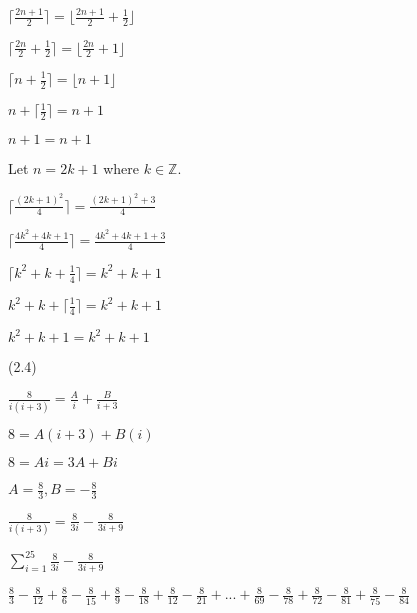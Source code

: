 \documentclass{exam}
\begin{document}
\begin{questions}
\begin{subparts}
\begin{center}
\( \lceil \frac{2n+1}{2} \rceil = \lfloor \frac{2n+1}{2} + \frac{1}{2} \rfloor \)

\( \lceil \frac{2n}{2} + \frac{1}{2} \rceil = \lfloor \frac{2n}{2} + 1 \rfloor \)

\( \lceil n + \frac{1}{2} \rceil = \lfloor n + 1 \rfloor \)

\( n + \lceil \frac{1}{2} \rceil = n + 1 \)

\( n + 1 = n + 1 \)

\end{center}


\begin{center}

Let \(n = 2k + 1\) where \(k \in \mathbb{Z}\).

\( \lceil \frac{(2k+1)^2}{4} \rceil = \frac{(2k+1)^2 + 3}{4} \)

\( \lceil \frac{4k^2 + 4k + 1}{4} \rceil = \frac{4k^2 + 4k + 1 + 3}{4} \)

\( \lceil k^2 + k + \frac{1}{4} \rceil = k^2 + k + 1 \)

\(  k^2 + k + \lceil \frac{1}{4} \rceil = k^2 + k + 1 \)

\(  k^2 + k + 1 = k^2 + k + 1 \)

\end{center}

\end{subparts}

 (2.4)
\begin{subparts}

\begin{center}

\( \frac{8}{i(i+3)} = \frac{A}{i} + \frac{B}{i+3} \)

\( 8 = A(i+3) + B(i) \)

\( 8 = Ai = 3A + Bi \)

\( A = \frac{8}{3}, B = -\frac{8}{3} \)

\( \frac{8}{i(i+3)} = \frac{8}{3i} - \frac{8}{3i+9} \)
\vspace{5px}

\( \sum_{i=1}^{25} \frac{8}{3i} - \frac{8}{3i+9} \)

\( \frac{8}{3} - \frac{8}{12} + \frac{8}{6} - \frac{8}{15} + \frac{8}{9} - \frac{8}{18} + \frac{8}{12} - \frac{8}{21} + ... + \frac{8}{69} - \frac{8}{78} + \frac{8}{72} - \frac{8}{81} + \frac{8}{75} - \frac{8}{84}\)


\end{center}
\end{subparts}
\end{questions}
\end{document}
